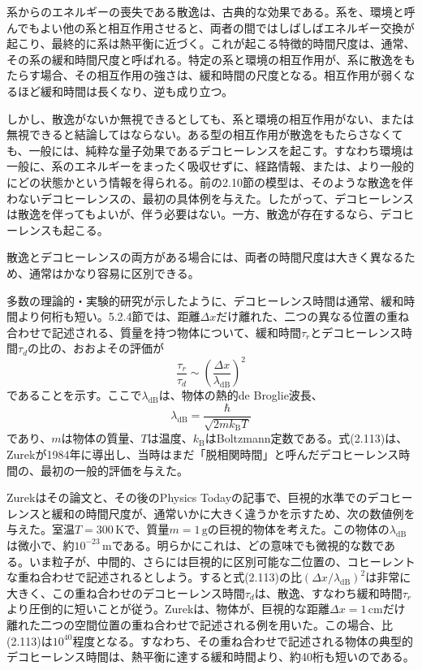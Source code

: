 

系からのエネルギーの喪失である散逸は、古典的な効果である。系を、環境と呼んでもよい他の系と相互作用させると、両者の間ではしばしばエネルギー交換が起こり、最終的に系は熱平衡に近づく。これが起こる特徴的時間尺度は、通常、その系の緩和時間尺度と呼ばれる。特定の系と環境の相互作用が、系に散逸をもたらす場合、その相互作用の強さは、緩和時間の尺度となる。相互作用が弱くなるほど緩和時間は長くなり、逆も成り立つ。

しかし、散逸がないか無視できるとしても、系と環境の相互作用がない、または無視できると結論してはならない。ある型の相互作用が散逸をもたらさなくても、一般には、純粋な量子効果であるデコヒーレンスを起こす。すなわち環境は一般に、系のエネルギーをまったく吸収せずに、経路情報、または、より一般的にどの状態かという情報を得られる。前の2.10節の模型は、そのような散逸を伴わないデコヒーレンスの、最初の具体例を与えた。したがって、デコヒーレンスは散逸を伴ってもよいが、伴う必要はない。一方、散逸が存在するなら、デコヒーレンスも起こる。

散逸とデコヒーレンスの両方がある場合には、両者の時間尺度は大きく異なるため、通常はかなり容易に区別できる。

\hypertarget{srcpage:94}{}\label{srcpage:94}
多数の理論的・実験的研究が示したように、デコヒーレンス時間は通常、緩和時間より何桁も短い。5.2.4節では、距離$\Delta x$だけ離れた、二つの異なる位置の重ね合わせで記述される、質量を持つ物体について、緩和時間$\tau_r$とデコヒーレンス時間$\tau_d$の比の、おおよその評価が
\begin{equation}\frac{\tau_r}{\tau_d}\sim\left(\frac{\Delta x}{\lambda_{\mathrm{dB}}}\right)^2\tag{2.113}\end{equation}
であることを示す。ここで$\lambda_{\mathrm{dB}}$は、物体の熱的de Broglie波長、
\begin{equation}\lambda_{\mathrm{dB}}=\frac{\hbar}{\sqrt{2mk_{\mathrm B}T}}\tag{2.114}\end{equation}
であり、$m$は物体の質量、$T$は温度、$k_{\mathrm B}$はBoltzmann定数である。式(2.113)は、Zurekが1984年に導出し\cite{ref012}、当時はまだ「脱相関時間」と呼んだデコヒーレンス時間の、最初の一般的評価を与えた。

Zurekはその論文と、その後のPhysics Todayの記事\cite{ref013}で、巨視的水準でのデコヒーレンスと緩和の時間尺度が、通常いかに大きく違うかを示すため、次の数値例を与えた。室温$T=300\,\mathrm K$で、質量$m=1\,\mathrm g$の巨視的物体を考えた。この物体の$\lambda_{\mathrm{dB}}$は微小で、約$10^{-23}\,\mathrm m$である。明らかにこれは、どの意味でも微視的な数である。いま粒子が、中間的、さらには巨視的に区別可能な二位置の、コヒーレントな重ね合わせで記述されるとしよう。すると式(2.113)の比$(\Delta x/\lambda_{\mathrm{dB}})^2$は非常に大きく、この重ね合わせのデコヒーレンス時間$\tau_d$は、散逸、すなわち緩和時間$\tau_r$より圧倒的に短いことが従う。Zurek\cite{ref012,ref013}は、物体が、巨視的な距離$\Delta x=1\,\mathrm{cm}$だけ離れた二つの空間位置の重ね合わせで記述される例を用いた。この場合、比(2.113)は$10^{40}$程度となる。すなわち、その重ね合わせで記述される物体の典型的デコヒーレンス時間は、熱平衡に達する緩和時間より、約40桁も短いのである。

